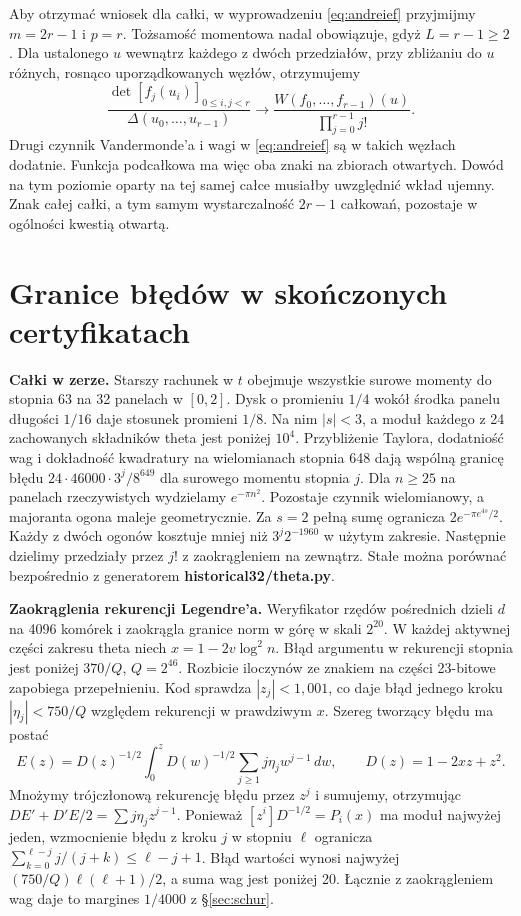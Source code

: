\documentclass[11pt,a4paper,reqno]{amsart}
\numberwithin{equation}{section}
\begin{document}
Aby otrzymać wniosek dla całki, w wyprowadzeniu \eqref{eq:andreief} przyjmijmy \(m=2r-1\) i \(p=r\). Tożsamość momentowa nadal obowiązuje, gdyż \(L=r-1\ge2\). Dla ustalonego \(u\) wewnątrz każdego z dwóch przedziałów, przy zbliżaniu do \(u\) różnych, rosnąco uporządkowanych węzłów, otrzymujemy
\[
 \frac{\det[f_j(u_i)]_{0\le i,j<r}}{\Delta(u_0,\ldots,u_{r-1})}
 \longrightarrow
 \frac{W(f_0,\ldots,f_{r-1})(u)}{\prod_{j=0}^{r-1}j!}.
\]
Drugi czynnik Vandermonde’a i wagi w \eqref{eq:andreief} są w takich węzłach dodatnie. Funkcja podcałkowa ma więc oba znaki na zbiorach otwartych. Dowód na tym poziomie oparty na tej samej całce musiałby uwzględnić wkład ujemny. Znak całej całki, a tym samym wystarczalność \(2r-1\) całkowań, pozostaje w ogólności kwestią otwartą.


\appendix

\section{Granice błędów w skończonych certyfikatach}\label{sec:errors}


\textbf{Całki w zerze.} Starszy rachunek w \(t\) obejmuje wszystkie surowe momenty do stopnia 63 na 32 panelach w \([0,2]\). Dysk o promieniu \(1/4\) wokół środka panelu długości \(1/16\) daje stosunek promieni \(1/8\). Na nim \(|s|<3\), a moduł każdego z 24 zachowanych składników theta jest poniżej \(10^4\). Przybliżenie Taylora, dodatniość wag i dokładność kwadratury na wielomianach stopnia 648 dają wspólną granicę błędu \(24\cdot46000\cdot3^j/8^{649}\) dla surowego momentu stopnia \(j\). Dla \(n\ge25\) na panelach rzeczywistych wydzielamy \(e^{-\pi n^2}\). Pozostaje czynnik wielomianowy, a majoranta ogona maleje geometrycznie. Za \(s=2\) pełną sumę ogranicza \(2e^{-\pi e^{4s}/2}\). Każdy z dwóch ogonów kosztuje mniej niż \(3^j2^{-1960}\) w użytym zakresie. Następnie dzielimy przedziały przez \(j!\) z zaokrągleniem na zewnątrz. Stałe można porównać bezpośrednio z generatorem \textbf{historical32/theta.py}.

\textbf{Zaokrąglenia rekurencji Legendre'a.} Weryfikator rzędów pośrednich dzieli \(d\) na 4096 komórek i zaokrągla granice norm w górę w skali \(2^{20}\). W każdej aktywnej części zakresu theta niech \(x=1-2v\log^2n\). Błąd argumentu w rekurencji stopnia jest poniżej \(370/Q\), \(Q=2^{46}\). Rozbicie iloczynów ze znakiem na części 23-bitowe zapobiega przepełnieniu. Kod sprawdza \(|z_j|<1{,}001\), co daje błąd jednego kroku \(|\eta_j|<750/Q\) względem rekurencji w prawdziwym \(x\). Szereg tworzący błędu ma postać \[E(z)=D(z)^{-1/2}\int_0^z D(w)^{-1/2}\sum_{j\ge1}j\eta_jw^{j-1}\,dw,\qquad D(z)=1-2xz+z^2.\] Mnożymy trójczłonową rekurencję błędu przez \(z^j\) i sumujemy, otrzymując \(DE'+D'E/2=\sum j\eta_j z^{j-1}\). Ponieważ \([z^i]D^{-1/2}=P_i(x)\) ma moduł najwyżej jeden, wzmocnienie błędu z kroku \(j\) w stopniu \(\ell\) ogranicza \(\sum_{k=0}^{\ell-j}j/(j+k)\le\ell-j+1\). Błąd wartości wynosi najwyżej \((750/Q)\ell(\ell+1)/2\), a suma wag jest poniżej 20. Łącznie z zaokrągleniem wag daje to margines \(1/4000\) z \S\ref{sec:schur}.
\end{document}
